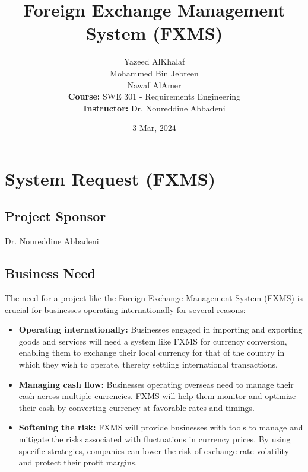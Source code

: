 \documentclass[a4paper]{report}
\title{Foreign Exchange Management System (FXMS)}
\author{
    Yazeed AlKhalaf \\
    Mohammed Bin Jebreen \\
    Nawaf AlAmer \\
    \textbf{Course:} SWE 301 - Requirements Engineering \\
    \textbf{Instructor:} Dr. Noureddine Abbadeni
}
\date{3 Mar, 2024}
\begin{document}
\maketitle

\newpage

\tableofcontents

\chapter{System Request (FXMS)}

\section{Project Sponsor}
Dr. Noureddine Abbadeni

\section{Business Need}
The need for a project like the Foreign Exchange Management System (FXMS) is crucial for businesses operating internationally for several reasons:
\begin{itemize}
    \item \textbf{Operating internationally:} Businesses engaged in importing and exporting goods and services will need a system like FXMS for currency conversion, enabling them to exchange their local currency for that of the country in which they wish to operate, thereby settling international transactions.
    \item \textbf{Managing cash flow:} Businesses operating overseas need to manage their cash across multiple currencies. FXMS will help them monitor and optimize their cash by converting currency at favorable rates and timings.
    \item \textbf{Softening the risk:} FXMS will provide businesses with tools to manage and mitigate the risks associated with fluctuations in currency prices. By using specific strategies, companies can lower the risk of exchange rate volatility and protect their profit margins.
\end{itemize}
\end{document}
